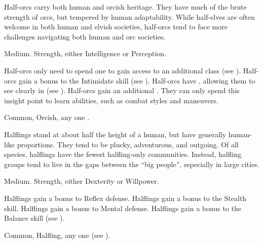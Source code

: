 
  Half-orcs carry both human and orcish heritage.
  They have much of the brute strength of orcs, but tempered by human adaptability.
  While half-elves are often welcome in both human and elvish societies, half-orcs tend to face more challenges navigating both human and orc societies.

   Medium.
    Strength, either  Intelligence or  Perception.
  \begin{raggeditemize}
     Half-orcs only need to spend one  to gain access to an additional class (see ).
     Half-orcs gain a  bonus to the Intimidate skill (see ).
     Half-orcs have , allowing them to see clearly in  (see ).
     Half-orcs gain an additional .
      They can only spend this insight point to learn  abilities, such as combat styles and maneuvers.
  \end{raggeditemize}
   Common, Orcish, any one .


  Halflings stand at about half the height of a human, but have generally human-like proportions.
  They tend to be plucky, adventurous, and outgoing.
  Of all species, halflings have the fewest halfling-only communities.
  Instead, halfling groups tend to live in the gaps between the ``big people'', especially in large cities.

   Medium.
    Strength, either  Dexterity or  Willpower.
  \begin{raggeditemize}
     Halflings gain a  bonus to Reflex defense.
     Halflings gain a  bonus to the Stealth skill.
     Halflings gain a  bonus to Mental defense.
     Halflings gain a  bonus to the Balance skill (see ).
  \end{raggeditemize}
   Common, Halfling, any one  (see ).

